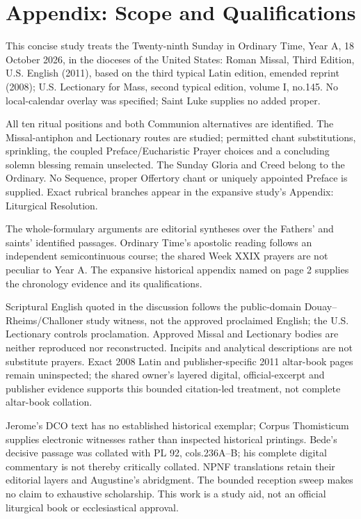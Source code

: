 \clearpage
\section{Appendix: Scope and Qualifications}
This concise study treats the Twenty-ninth Sunday in Ordinary Time, Year A, 18 October 2026, in the dioceses of the United States: Roman Missal, Third Edition, U.S. English (2011), based on the third typical Latin edition, emended reprint (2008); U.S. Lectionary for Mass, second typical edition, volume I, no.145. No local-calendar overlay was specified; Saint Luke supplies no added proper.

All ten ritual positions and both Communion alternatives are identified. The Missal-antiphon and Lectionary routes are studied; permitted chant substitutions, sprinkling, the coupled Preface/Eucharistic Prayer choices and a concluding solemn blessing remain unselected. The Sunday Gloria and Creed belong to the Ordinary. No Sequence, proper Offertory chant or uniquely appointed Preface is supplied. Exact rubrical branches appear in the expansive study's Appendix: Liturgical Resolution.

The whole-formulary arguments are editorial syntheses over the Fathers' and saints' identified passages. Ordinary Time's apostolic reading follows an independent semicontinuous course; the shared Week XXIX prayers are not peculiar to Year A. The expansive historical appendix named on page 2 supplies the chronology evidence and its qualifications.

Scriptural English quoted in the discussion follows the public-domain Douay--Rheims/Challoner study witness, not the approved proclaimed English; the U.S. Lectionary controls proclamation. Approved Missal and Lectionary bodies are neither reproduced nor reconstructed. Incipits and analytical descriptions are not substitute prayers. Exact 2008 Latin and publisher-specific 2011 altar-book pages remain uninspected; the shared owner's layered digital, official-excerpt and publisher evidence supports this bounded citation-led treatment, not complete altar-book collation.

Jerome's DCO text has no established historical exemplar; Corpus Thomisticum supplies electronic witnesses rather than inspected historical printings. Bede's decisive passage was collated with PL 92, cols.236A--B; his complete digital commentary is not thereby critically collated. NPNF translations retain their editorial layers and Augustine's abridgment. The bounded reception sweep makes no claim to exhaustive scholarship. This work is a study aid, not an official liturgical book or ecclesiastical approval.

